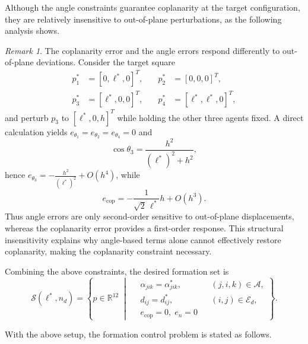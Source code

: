 \documentclass[letterpaper,journal]{IEEEtran}
\theoremstyle{plain}
\theoremstyle{definition}
\theoremstyle{remark}
\newtheorem{remark}{Remark}
\begin{document}
Although the angle constraints guarantee coplanarity at the target configuration, they are relatively insensitive to out-of-plane perturbations, as the following analysis shows.

\begin{remark}
\label{rem:coplanarity-sensitivity}
The coplanarity error and the angle errors respond differently to out-of-plane deviations. Consider the target square
\[
\begin{aligned}
p_1^*&=[0,\ell^*,0]^{T}, &\quad p_2^*&=[0,0,0]^{T},\\
p_3^*&=[\ell^*,0,0]^{T}, &\quad p_4^*&=[\ell^*,\ell^*,0]^{T},
\end{aligned}
\]
and perturb \(p_3\) to \([\ell^*,0,h]^{T}\) while holding the other three agents fixed. A direct calculation yields \(e_{\theta_1}=e_{\theta_2}=e_{\theta_4}=0\) and
\[
\cos\theta_3=\frac{h^2}{(\ell^*)^2+h^2},
\]
hence \(e_{\theta_3}=-\frac{h^2}{(\ell^*)^2}+O(h^4)\), while
\[
e_{\mathrm{cop}}=-\frac{1}{\sqrt{2}\,\ell^*}h+O(h^3).
\]
Thus angle errors are only second-order sensitive to out-of-plane displacements, whereas the coplanarity error provides a first-order response. This structural insensitivity explains why angle-based terms alone cannot effectively restore coplanarity, making the coplanarity constraint necessary.
\end{remark}

Combining the above constraints, the desired formation set is
\begin{equation}
\label{eq:desired-formation-set}
\mathcal S(\ell^*,n_d)=\left\{
p\in\mathbb R^{12}\;\middle|\;
\begin{aligned}
&\alpha_{jik}=\alpha_{jik}^*, &&(j,i,k)\in\mathcal A,\\
&d_{ij}=d_{ij}^*, &&(i,j)\in\mathcal E_d,\\
&e_{\mathrm{cop}}=0,\; e_n=0
\end{aligned}\right\}.
\end{equation}

With the above setup, the formation control problem is stated as follows.
\end{document}
